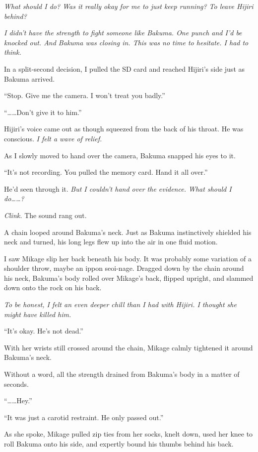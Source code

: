 \documentclass[
    a4paper,
    12pt,
    twoside,
    openany,
    UTF8,
    fontset=windows
]{ctexbook}
\begin{document}
\textit{What should I do? Was it really okay for me to just keep running? To leave Hijiri behind?}

\textit{I didn't have the strength to fight someone like Bakuma. One punch and I'd be knocked out. And Bakuma was closing in. This was no time to hesitate. I had to think.}

In a split-second decision, I pulled the SD card and reached Hijiri's side just as Bakuma arrived.

``Stop. Give me the camera. I won't treat you badly.''

``\dots\dots Don't give it to him.''

Hijiri's voice came out as though squeezed from the back of his throat. He was conscious. \textit{I felt a wave of relief.}

As I slowly moved to hand over the camera, Bakuma snapped his eyes to it.

``It's not recording. You pulled the memory card. Hand it all over.''

He'd seen through it. \textit{But I couldn't hand over the evidence. What should I do\dots\dots?}

\textit{Clink.} The sound rang out.

A chain looped around Bakuma's neck. Just as Bakuma instinctively shielded his neck and turned, his long legs flew up into the air in one fluid motion.

I saw Mikage slip her back beneath his body. It was probably some variation of a shoulder throw, maybe an ippon seoi-nage. Dragged down by the chain around his neck, Bakuma's body rolled over Mikage's back, flipped upright, and slammed down onto the rock on his back.

\textit{To be honest, I felt an even deeper chill than I had with Hijiri. I thought she might have killed him.}

``It's okay. He's not dead.''

With her wrists still crossed around the chain, Mikage calmly tightened it around Bakuma's neck.

Without a word, all the strength drained from Bakuma's body in a matter of seconds.

``\dots\dots Hey.''

``It was just a carotid restraint. He only passed out.''

As she spoke, Mikage pulled zip ties from her socks, knelt down, used her knee to roll Bakuma onto his side, and expertly bound his thumbs behind his back.
\end{document}
